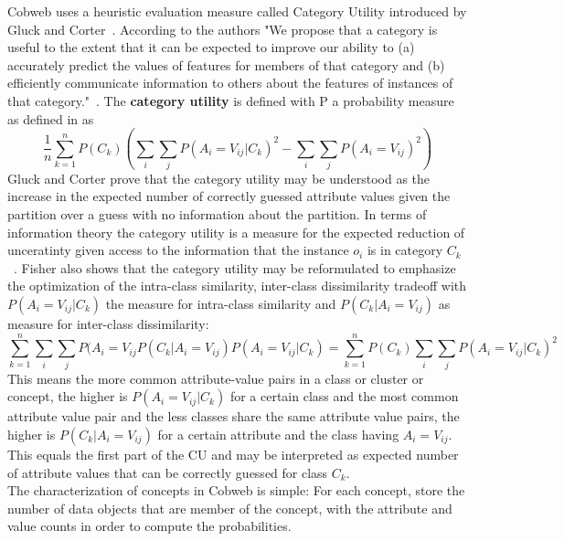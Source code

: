Cobweb uses a heuristic evaluation measure called Category Utility introduced by Gluck and Corter~\cite{gluck1985information}. According to the authors "We propose that a category is useful to the extent that it can be expected to improve our ability to (a) accurately predict the values of features for members of that category and (b) efficiently communicate information to others about the features of instances of that category."~\cite{gluck1985information}. 
The \textbf{category utility} is defined with P a probability measure as defined in  as
\[ \frac{1}{n} \sum_{k = 1}^n P(C_k) ( \sum_i \sum_j P(A_i = V_{ij}| C_k)^2 - \sum_i \sum_j P(A_i = V_{ij})^2) \]
Gluck and Corter prove that the category utility may be understood as the increase in the expected number of correctly guessed attribute values given the partition over a guess with no information about the partition. In terms of information theory the category utility is a measure for the expected reduction of unceratinty given access to the information that the instance $o_i$ is in category $C_k$~\cite{corter1992explaining}. Fisher also shows that the category utility may be reformulated to emphasize the optimization of the intra-class similarity, inter-class dissimilarity tradeoff with $P(A_i = V_{ij} | C_k)$ the measure for intra-class similarity and $P(C_k | A_i = V_{ij})$ as measure for inter-class dissimilarity: \[ \sum_{k = 1}^n \sum_i \sum_j P(A_i = V_{ij} P(C_k| A_i = V_{ij})P(A_i = V_{ij}| C_k) = \sum_{k = 1}^n P(C_k) \sum_i \sum_j P(A_i = V_{ij}| C_k)^2 \]
This means the more common attribute-value pairs in a class or cluster or concept, the higher is $P(A_i = V_{ij} | C_k)$ for a certain class and the most common attribute value pair and the less classes share the same attribute value pairs, the higher is $P(C_k | A_i = V_{ij})$ for a certain attribute and the class having $A_i = V_{ij}$.
This equals the first part of the CU and may be interpreted as expected number of attribute values that can be correctly guessed for class $C_k$. \\

The characterization of concepts in Cobweb is simple: For each concept, store the number of data objects that are member of the concept, with the attribute and value counts in order to compute the probabilities. \\
 \\

